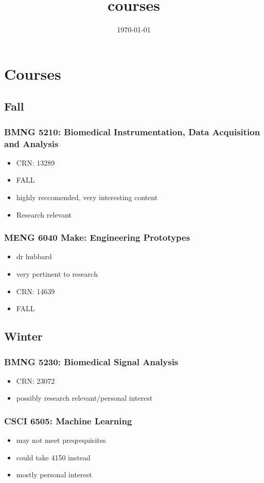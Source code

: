 \documentclass[11pt]{article}
\date{\today}
\title{courses}
\begin{document}
\section{Courses}
\label{sec:org66935e6}


\subsection{Fall}
\label{sec:org2b391af}
\subsubsection{BMNG 5210: Biomedical Instrumentation, Data Acquisition and Analysis}
\label{sec:org5f8d9d7}
\begin{itemize}
\item CRN: 13289
\item FALL
\item highly reccomended, very interesting content
\item Research relevant
\end{itemize}

\subsubsection{MENG 6040  Make: Engineering Prototypes}
\label{sec:org7576ec4}
\begin{itemize}
\item dr hubbard
\item very pertinent to research
\item CRN: 14639
\item FALL
\end{itemize}

\subsection{Winter}
\label{sec:org86b99fc}
\subsubsection{BMNG 5230: Biomedical Signal Analysis}
\label{sec:orgccbd33e}
\begin{itemize}
\item CRN: 23072
\item possibly research relevant/personal interest
\end{itemize}

\subsubsection{CSCI 6505: Machine Learning}
\label{sec:org882a7ee}
\begin{itemize}
\item may not meet preqrequisites
\item could take 4150 instead
\item mostly personal interest
\end{itemize}
\end{document}
